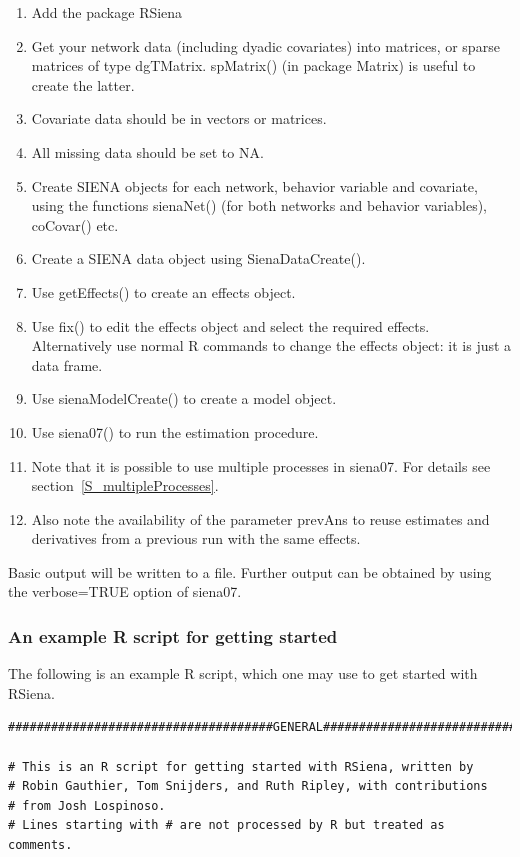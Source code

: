 \documentclass[a4paper,fleqn]{article}
\newcommand{\+}{\, + \,}
\newcommand{\sfn}[1]{\textsf{#1}}
\newcommand{\R}{{\sf R }}
\newcommand{\rs}{{\sf RSiena}}
\newcommand{\RS}{{\sf RSiena }}
\newcommand{\SI}{{\sf SIENA }}
\begin{document}
{\begin{enumerate}
\item Add the package \RS
\item Get your network data (including dyadic covariates)
   into matrices, or sparse matrices of type
  \sfn{dgTMatrix}. \sfn{spMatrix()} (in package \sfn{Matrix}) is useful to
  create the latter.
\item Covariate data should be in vectors or matrices.
\item All missing data should be set to NA.
\item Create \SI objects for each network, behavior variable and covariate,
  using the functions \sfn{sienaNet()} (for both networks and behavior
  variables), \sfn{coCovar()} etc.
\item Create a \SI data object using \sfn{SienaDataCreate()}.
\item Use \sfn{getEffects()} to create an effects object.
\item Use \sfn{fix()} to edit the effects object and select the required
  effects. Alternatively use normal \R commands to change the effects object: it
  is just a data frame.
\item Use \sfn{sienaModelCreate()} to create a model object.
\item Use \sfn{siena07()} to run the estimation procedure.
\item Note that it is possible to use multiple processes in \sfn{siena07}. For
  details see section~\ref{S_multipleProcesses}.
\item Also note the availability of the parameter \sfn{prevAns} to reuse
  estimates and derivatives from a previous run with the same effects.
\end{enumerate}
Basic output will be written to a file. Further output can be obtained by using
the \sfn{verbose=TRUE} option of \sfn{siena07}.

\subsubsection{An example \R script for getting started}
\label{S_Rscript}

The following is an example \R script,
which one may use to get started with \rs.

\begin{verbatim}
#####################################GENERAL###################################

# This is an R script for getting started with RSiena, written by
# Robin Gauthier, Tom Snijders, and Ruth Ripley, with contributions
# from Josh Lospinoso.
# Lines starting with # are not processed by R but treated as comments.


\end{verbatim}}
\end{document}
